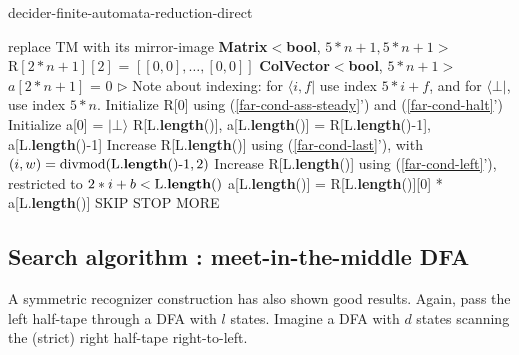 \begin{algorithm}
  \caption{{\sc decider-finite-automata-reduction-direct}}\label{alg:finite-automata-reduction-direct}

  \begin{algorithmic}[1]
     replace TM with its mirror-image
    \EndIf
    \State \textbf{Matrix$\boldsymbol<$bool}, $5*n+1, 5*n+1\boldsymbol>$ $\textrm{R}[2*n+1][2]$ = $[[0,0],\ldots,[0,0]]$
    \State \textbf{ColVector$\boldsymbol<$bool}, $5*n+1\boldsymbol>$ $a[2*n+1]$ = 0
    \State \(\triangleright\) Note about indexing: for $\langle i,f\vert$ use index $5*i+f$, and for $\langle\bot\vert$, use index $5*n$.
    \State Initialize R[0] using (\ref{far-cond-ass-steady}') and (\ref{far-cond-halt}')
    \State Initialize a[0] = $\vert\bot\rangle$
    \State R[L.\textbf{length}()], a[L.\textbf{length}()] = R[L.\textbf{length}()-1], a[L.\textbf{length}()-1]
    \State Increase R[L.\textbf{length}()] using (\ref{far-cond-last}'), with $(i,w)=\operatorname{divmod}(\textrm{L.\textbf{length}()-1}, 2)$
    \Repeat
    \State Increase R[L.\textbf{length}()] using (\ref{far-cond-left}'), restricted to $2*i+b<\textrm{L.\textbf{length}()}$
    \Repeat
    \State a[L.\textbf{length}()] = R[L.\textbf{length}()][0] * a[L.\textbf{length}()]
    \Return SKIP
    \Return STOP
    \Else\;\Return MORE
    \EndIf
    \EndProcedure
    \State \Return {}
    \EndProcedure
  \end{algorithmic}
\end{algorithm}


\subsection{Search algorithm : meet-in-the-middle DFA}
\label{far-algo-mtim_dfa}
A symmetric recognizer construction has also shown good results.
Again, pass the left half-tape through a DFA with $l$ states.
Imagine a DFA with $d$ states scanning the (strict) right half-tape right-to-left.

